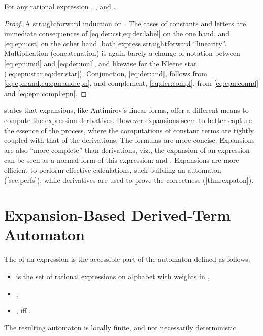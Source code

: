 \documentclass[a4paper,USenglish]{lipics}
\begin{document}
\begin{Proposition}\label{prop:expa:der}
  For any rational expression , , and
  .
\end{Proposition}

\begin{proof}
  A straightforward induction on .  The cases of constants and letters
  are immediate consequences of \cref{eq:der:cst,eq:der:label} on the one
  hand, and \cref{eq:epn:cst} on the other hand.
   both express straightforward ``linearity''.
  Multiplication (concatenation) is again barely a change of notation
  between \cref{eq:epn:mul} and \cref{eq:der:mul}, and likewise for the
  Kleene star (\cref{eq:epn:star,eq:der:star}).  Conjunction,
  \cref{eq:der:and}, follows from \cref{eq:epn:and,eq:epn:and:epn}, and
  complement, \cref{eq:der:compl}, from \cref{eq:epn:compl} and
  \cref{eq:epn:compl:epn}.
\end{proof}

 states that expansions, like Antimirov's linear forms,
offer a different means to compute the expression derivatives.  However
expansions seem to better capture the essence of the process, where the
computations of constant terms are tightly coupled with that of the
derivations.  The formulas are more concise.  Expansions are also ``more
complete'' than derivations, viz., the expansion of an expression can be
seen as a normal-form of this expression:  and
.  Expansions are more efficient to perform
effective calculations, such building an automaton (\cref{sec:perfs}), while
derivatives are used to prove the correctness (\cref{thm:expaton}).

\section{Expansion-Based Derived-Term Automaton}
\label{sec:expaton}
\vspace{-1ex}
\begin{Definition}
  \label{def:expaton}
  The  of an expression  is the accessible
  part of the automaton 
  defined as follows:
  \begin{itemize}
  \item  is the set of rational expressions on alphabet  with weights
    in ,
  \item
    ,
  \item ,  iff .
  \end{itemize}
\end{Definition}
The resulting automaton is locally finite, and not necessarily
deterministic.
\end{document}
